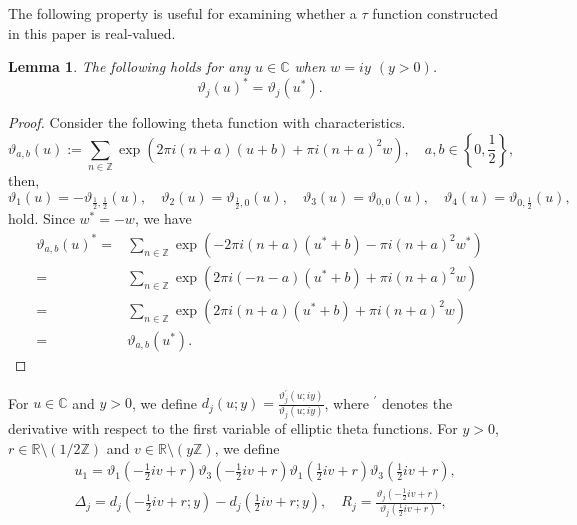 \documentclass[10pt,leqno]{amsart}
\newcommand{\R}{\mathbb{R}}
\newtheorem{lem}[theorem]{Lemma}
\numberwithin{equation}{section}
\begin{document}
The following property is useful for examining whether a $\tau$ function constructed in this paper is real-valued.
\begin{lem}\label{lem:theta_property}
The following holds for any $u\in\mathbb{C}$ when $w=iy$ $(y>0)$.
\begin{equation}\label{eqn:zbar}
\vartheta_j(u)^*=\vartheta_j(u^*).
\end{equation}
\end{lem}
\begin{proof}
Consider the following theta function with characteristics.
\begin{equation}
\vartheta_{a, b}(u):=\sum_{n\in\mathbb{Z}}\exp\left(2\pi i(n+a)(u+b)+\pi i (n+a)^2w\right),\quad a, b\in\left\{0, \frac{1}{2}\right\},
\end{equation}
then,
\begin{equation}
\vartheta_1(u)=-\vartheta_{\frac{1}{2}, \frac{1}{2}}(u),\quad \vartheta_2(u)=\vartheta_{\frac{1}{2}, 0}(u),\quad \vartheta_3(u)=\vartheta_{0, 0}(u),\quad \vartheta_4(u)=\vartheta_{0, \frac{1}{2}}(u),
\end{equation}
hold. Since $w^*=-w$, we have
\begin{equation}
\begin{split}
\vartheta_{a, b}(u)^*=&\sum_{n\in\mathbb{Z}}\exp\left(-2\pi i(n+a)(u^*+b)-\pi i (n+a)^2w^*\right)\\
=&\sum_{n\in\mathbb{Z}}\exp\left(2\pi i(-n-a)(u^*+b)+\pi i (n+a)^2w\right)\\
=&\sum_{n\in\mathbb{Z}}\exp\left(2\pi i(n+a)(u^*+b)+\pi i (n+a)^2w\right)\\
=&\vartheta_{a, b}(u^*).
\end{split}
\end{equation}
\end{proof} 
For $u\in \mathbb{C}$ and $y>0$,
we define 
$d_j(u;y)=\frac{\vartheta^{'}_j(u;iy)}{\vartheta_j(u;iy)}$,
where $^{'}$ denotes the derivative with respect to the first variable of elliptic theta functions.
For $y>0$, $r \in \R \setminus{(1/2\mathbb{Z})}$ and $v \in \R \setminus{(y\mathbb{Z})}$,
we define
\begin{align}
&u_{1}=\vartheta_1\left(-\frac{1}{2}iv+r\right)\vartheta_3\left(-\frac{1}{2}iv+r\right)\vartheta_1\left(\frac{1}{2}iv+r\right)\vartheta_3\left(\frac{1}{2}iv+r\right),\\
&\Delta_{j}=d_{j}\left(-\frac{1}{2}iv+r;y\right)-d_{j}\left(\frac{1}{2}iv+r;y\right), \quad R_{j}=\frac{\vartheta_{j}\left(-\frac{1}{2}iv+r\right)}{\vartheta_{j}\left(\frac{1}{2}iv+r\right)}, \nonumber
\end{align}
\end{document}
